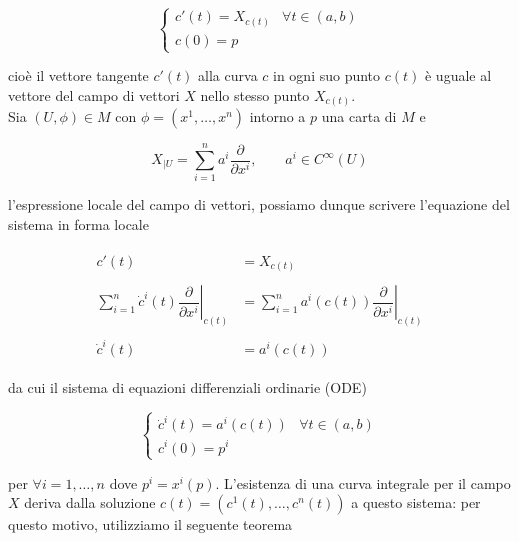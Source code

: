 \begin{equation}
	\begin{cases}
		c'(t) = X_{c(t)} & \forall t \in (a,b)\\
		c(0) = p
	\end{cases}
\end{equation}

cioè il vettore tangente $ c'(t) $ alla curva $ c $ in ogni suo punto $ c(t) $ è uguale al vettore del campo di vettori $ X $ nello stesso punto $ X_{c(t)} $.\\
Sia $ (U,\phi) \in M $ con $ \phi = (x^{1},\dots,x^{n}) $ intorno a $ p $ una carta di $ M $ e

\begin{equation}
	X_{|U} = \sum_{i=1}^{n} a^{i} \dfrac{\partial}{\partial x^{i}}, \qquad a^{i} \in C^{\infty}(U)
\end{equation}

l'espressione locale del campo di vettori, possiamo dunque scrivere l'equazione del sistema in forma locale

\begin{align}
	\begin{split}
		c'(t) &= X_{c(t)}\\\\
		\sum_{i=1}^{n} \dot{c}^{i}(t) \left. \dfrac{\partial}{\partial x^{i}} \right|_{c(t)} &= \sum_{i=1}^{n} a^{i}(c(t)) \left. \dfrac{\partial}{\partial x^{i}} \right|_{c(t)}\\\\
		\dot{c}^{i}(t) &= a^{i}(c(t))
	\end{split}
\end{align}

da cui il sistema di equazioni differenziali ordinarie (ODE)

\begin{equation}
	\begin{cases}
		\dot{c}^{i}(t) = a^{i}(c(t)) & \forall t \in (a,b)\\
		c^{i}(0) = p^{i}
	\end{cases}
\end{equation}

per $ \forall i=1,\dots,n $ dove $ p^{i} = x^{i} (p) $. L'esistenza di una curva integrale per il campo $ X $ deriva dalla soluzione $ c(t) = (c^{1}(t),\dots,c^{n}(t)) $ a questo sistema: per questo motivo, utilizziamo il seguente teorema

